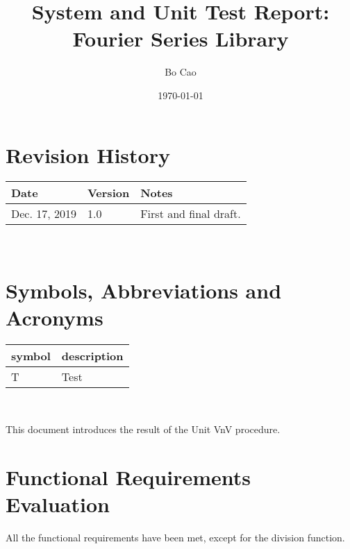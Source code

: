 \documentclass[12pt, titlepage]{article}
\begin{document}
\title{System and Unit Test Report: Fourier Series Library} 
\author{Bo Cao}
\date{\today}
	
\maketitle


\section{Revision History}

\begin{tabularx}{\textwidth}{p{3cm}p{2cm}X}
\toprule {\bf Date} & {\bf Version} & {\bf Notes}\\
\midrule
Dec. 17, 2019 & 1.0 & First and final draft.\\
\bottomrule
\end{tabularx}

~\newpage

\section{Symbols, Abbreviations and Acronyms}

\renewcommand{\arraystretch}{1.2}
\begin{tabular}{l l} 
  \toprule		
  \textbf{symbol} & \textbf{description}\\
  \midrule 
  T & Test\\
  \bottomrule
\end{tabular}\\


\newpage

\tableofcontents

\listoftables %

\listoffigures %

\newpage


This document introduces the result of the Unit VnV procedure.

\section{Functional Requirements Evaluation}\label{Sc:FR}
All the functional requirements have been met, except for the division function.
\end{document}
